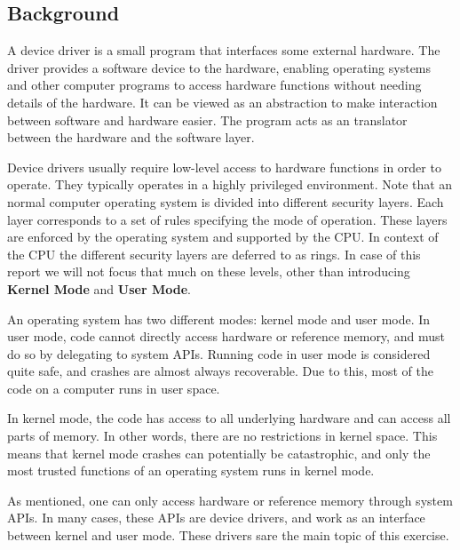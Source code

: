 \subsection{Background}
A device driver is a small program that interfaces some external hardware. The driver provides a software device to the hardware, enabling operating systems and other computer programs to access hardware functions without needing details of the hardware. It can be viewed as an abstraction to make interaction between software and hardware easier. The program acts as an translator between the hardware and the software layer. 

Device drivers usually require low-level access to hardware functions in order to operate. They typically operates in a highly privileged environment. Note that an normal computer operating system is divided into different security layers. Each layer corresponds to a set of rules specifying the mode of operation. These layers are enforced by the operating system and supported by the CPU. In context of the CPU the different security layers are deferred to as rings. In case of this report we will not focus that much on these levels, other than introducing {\bf Kernel Mode} and {\bf User Mode}. 


An operating system has two different modes: kernel mode and user mode. In user mode, code cannot directly access hardware or reference memory, and must do so by delegating to system APIs. Running code in user mode is considered quite safe, and crashes are almost always recoverable. Due to this, most of the code on a computer runs in user space. 

In kernel mode, the code has access to all underlying hardware and can access all parts of memory. In other words, there are no restrictions in kernel space. This means that kernel mode crashes can potentially be catastrophic, and only the most trusted functions of an operating system runs in kernel mode. 
	
As mentioned, one can only access hardware or reference memory through system APIs. In many cases, these APIs are device drivers, and work as an interface between kernel and user mode. These drivers sare the main topic of this exercise.



